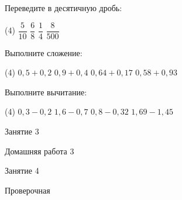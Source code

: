 \begin{homework}[number=2]
	\begin{listofex}
		\item Переведите в десятичную дробь:
		\begin{tasks}(4)
			\task \( \dfrac{5}{10} \)
			\task \( \dfrac{6}{8} \)
			\task \( \dfrac{1}{4} \)
			\task \( \dfrac{8}{500} \)
		\end{tasks}
		\item Выполните сложение:
		\begin{tasks}(4)
			\task \( 0,5+0,2 \)
			\task \( 0,9+0,4 \)
			\task \( 0,64+0,17 \)
			\task \( 0,58+0,93 \)
		\end{tasks}
		\item Выполните вычитание:
		\begin{tasks}(4)
			\task \( 0,3-0,2 \)
			\task \( 1,6-0,7 \)
			\task \( 0,8-0,32 \)
			\task \( 1,69-1,45 \)
		\end{tasks}
	\end{listofex}
\end{homework}


\begin{class}[number=3]
	\begin{listofex}
		\item Занятие 3 
	\end{listofex}
\end{class}
	
\begin{homework}[number=3]
	\begin{listofex}
		\item Домашняя работа 3
	\end{listofex}
\end{homework}

\begin{class}[number=4]
	\begin{listofex}
		\item Занятие 4
	\end{listofex}
\end{class}
	
\begin{exam}
	\begin{listofex}
		\item Проверочная
	\end{listofex}
\end{exam}
